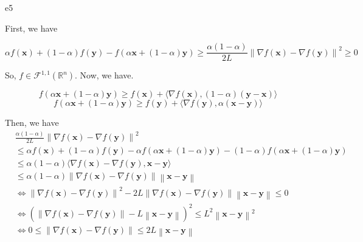 \documentclass{article}
\newcommand{\xB}{\bm{x}}
\newcommand{\yB}{\bm{y}}
\begin{document}
\begin{PROOF}{e5}
		
		
		
		
		
		
	First, we have

	\[
	\alpha f(\bm{x}) + (1 - \alpha) f(\bm{y}) - f(\alpha \bm{x} + (1 - \alpha) \bm{y}) \geq \frac{\alpha (1 - \alpha)}{2L} \left\| \nabla f(\bm{x}) - \nabla f(\bm{y}) \right\|^2 \geq 0
	\]

	So, \(f \in \mathcal{F}^{1,1}(\mathbb{R}^n)\). Now, we have.

	\[
	f(\alpha \bm{x} + (1 - \alpha) \bm{y}) \geq f(\bm{x}) + \langle \nabla f(\bm{x}), (1 - \alpha) (\bm{y} - \bm{x}) \rangle
	\]
	\[
	f(\alpha \bm{x} + (1 - \alpha) \bm{y}) \geq f(\bm{y}) + \langle \nabla f(\bm{y}), \alpha (\bm{x} - \bm{y}) \rangle
	\]

	Then, we have
	\[
	\begin{aligned}
	&\frac{\alpha (1 - \alpha)}{2L} \left\| \nabla f(\bm{x}) - \nabla f(\bm{y}) \right\|^2\\
	&\leq \alpha f(\bm{x}) + (1 - \alpha) f(\bm{y}) - \alpha f(\alpha \bm{x} + (1 - \alpha) \bm{y}) - (1 - \alpha) f(\alpha \bm{x} + (1 - \alpha) \bm{y})\\
	&\leq \alpha (1 - \alpha) \langle \nabla f(\bm{x}) - \nabla f(\bm{y}), \bm{x} - \bm{y} \rangle\\
	&\leq \alpha (1 - \alpha) \left\| \nabla f(\bm{x}) - \nabla f(\bm{y}) \right\| \left\| \bm{x} - \bm{y} \right\|\\
	&\Leftrightarrow \left\| \nabla f(\bm{x}) - \nabla f(\bm{y}) \right\|^2 - 2L \left\| \nabla f(\bm{x}) - \nabla f(\bm{y}) \right\| \left\| \bm{x} - \bm{y} \right\| \leq 0\\
	&\Leftrightarrow \left( \left\| \nabla f(\bm{x}) - \nabla f(\bm{y}) \right\| - L \left\| \bm{x} - \bm{y} \right\| \right)^2 \leq L^2 \left\| \bm{x} - \bm{y} \right\|^2\\
	&\Leftrightarrow 0 \leq \left\| \nabla f(\bm{x}) - \nabla f(\bm{y}) \right\| \leq 2L \left\| \bm{x} - \bm{y} \right\|
	\end{aligned}
	\]


\end{PROOF}
\end{document}
